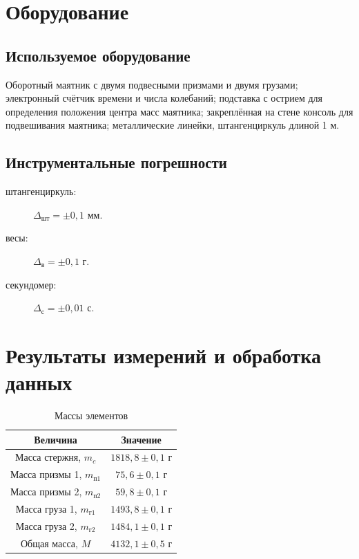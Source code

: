 \documentclass[a4paper]{article}
\begin{document}
\section{Оборудование}
\subsection{Используемое оборудование}
Оборотный маятник с двумя подвесными призмами и двумя грузами; электронный счётчик времени и числа колебаний; подставка с острием для определения положения центра масс маятника; закреплённая на стене консоль для подвешивания маятника; металлические линейки, штангенциркуль длиной 1 м.
\subsection{Инструментальные погрешности}
\vspace{0.15 cm}

\begin{description}
    \item[штангенциркуль:] $\Delta_\text{шт}=\pm0,1$ мм.
    \item[весы:] $\Delta_\text{в}=\pm0,1$ г.
    \item[секундомер:] $\Delta_\text{с}=\pm0,01$ с.
\end{description}
\newpage
\section{Результаты измерений и обработка данных}

\begin{table}[!h]
\centering
\caption{Массы элементов}
\begin{tabular}{|c|c|}      
\hline
Величина & Значение \\  \hline
Масса стержня, $m_c$ & $1818,8 \pm 0,1$ г \\ \hline
Масса призмы 1, $m_\text{п1}$ & $75,6 \pm 0,1$ г\\ \hline
Масса призмы 2, $m_\text{п2}$ & $59,8 \pm 0,1$ г\\ \hline
Масса груза 1, $m_\text{г1}$ & $1493,8 \pm 0,1$ г\\ \hline
Масса груза 2, $m_{г2}$ & $1484,1 \pm 0,1$ г\\ \hline
Общая масса, $M$ & $4132,1 \pm 0,5$ г\\ \hline
\end{tabular}
\end{table}
\end{document}
